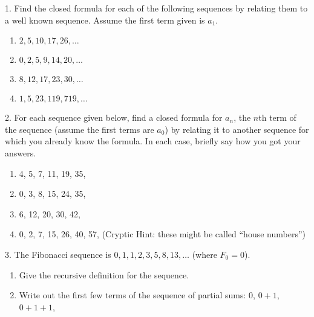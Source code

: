 \documentclass[12pt,]{book}
\theoremstyle{plain}
\theoremstyle{definition}
\theoremstyle{definition}
\theoremstyle{definition}
\numberwithin{equation}{chapter}
\begin{document}
\begin{exerciselist}
\item[1.]\hypertarget{exercise-1}{}\hypertarget{p-78}{}%
Find the closed formula for each of the following sequences by relating them to a well known sequence. Assume the first term given is \(a_1\).%
\leavevmode%
\begin{enumerate}[label=(\alph*)]
\item\hypertarget{li-50}{}\(2, 5, 10, 17, 26, \ldots\)%
\item\hypertarget{li-51}{}\(0, 2, 5, 9, 14, 20, \ldots\)%
\item\hypertarget{li-52}{}\(8, 12, 17, 23, 30,\ldots\)%
\item\hypertarget{li-53}{}\(1, 5, 23, 119, 719,\ldots\)%
\end{enumerate}
\par\smallskip
\item[2.]\hypertarget{exercise-2}{}\hypertarget{p-80}{}%
For each sequence given below, find a closed formula for \(a_n\), the \(n\)th term of the sequence (assume the first terms are \(a_0\)) by relating it to another sequence for which you already know the formula. In each case, briefly say how you got your answers.%
\leavevmode%
\begin{enumerate}[label=(\alph*)]
\item\hypertarget{li-58}{}\hypertarget{p-81}{}%
4, 5, 7, 11, 19, 35, \textellipsis{} %
\item\hypertarget{li-59}{}\hypertarget{p-82}{}%
0, 3, 8, 15, 24, 35, \textellipsis{} %
\item\hypertarget{li-60}{}\hypertarget{p-83}{}%
6, 12, 20, 30, 42, \textellipsis{} %
\item\hypertarget{li-61}{}\hypertarget{p-84}{}%
0, 2, 7, 15, 26, 40, 57, \textellipsis{} (Cryptic Hint: these might be called ``house numbers'') %
\end{enumerate}
\par\smallskip
\item[3.]\hypertarget{exercise-3}{}\hypertarget{p-85}{}%
The Fibonacci sequence is \(0, 1, 1, 2, 3, 5, 8, 13, \ldots\) (where \(F_0 = 0\)).%
\par
\hypertarget{p-86}{}%
\leavevmode%
\begin{enumerate}[label=(\alph*)]
\item\hypertarget{li-62}{}\hypertarget{p-87}{}%
Give the recursive definition for the sequence.%
\item\hypertarget{li-63}{}\hypertarget{p-88}{}%
Write out the first few terms of the sequence of partial sums: \(0\), \(0+1\), \(0+1+1\),\textellipsis{}%

\end{enumerate}
\end{exerciselist}
\end{document}
